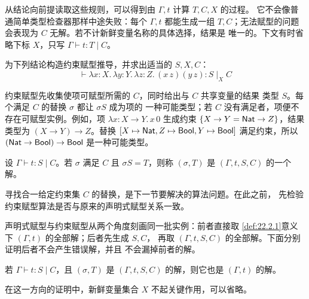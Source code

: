从结论向前提读取这些规则，可以得到由 \(\Gamma,t\) 计算 \(T,C,X\) 的过程。
它不会像普通简单类型检查器那样中途失败：每个 \(\Gamma,t\) 都能生成一组
\(T,C\)；无法赋型的问题会表现为 \(C\) 无解。若不计新鲜变量名称的具体选择，结果是
唯一的。下文有时省略下标 \(X\)，只写
\(\Gamma\vdash t:T\mid C\)。

\begin{exercise}[\(\star\), \(\nrightarrow\)]
\label{ex:22.3.3}
为下列结论构造约束赋型推导，并求出适当的 \(S,X,C\)：
\[
\vdash\lambda x:X.\,\lambda y:Y.\,\lambda z:Z.\,(x\,z)(y\,z)
  :S\mid_XC
\]
\end{exercise}

约束赋型先收集使项可赋型所需的 \(C\)，同时给出与 \(C\) 共享变量的结果
类型 \(S\)。每个满足 \(C\) 的替换 \(\sigma\) 都让 \(\sigma S\) 成为项的
一种可能类型；若 \(C\) 没有满足者，项便不存在可赋型实例。例如，项
\(\lambda x:X\to Y.\,x\,0\) 生成约束
\(\{X\to Y=\mathsf{Nat}\to Z\}\)，结果类型为
\((X\to Y)\to Z\)。替换
\([X\mapsto\mathsf{Nat},Z\mapsto\mathsf{Bool},
Y\mapsto\mathsf{Bool}]\) 满足约束，所以
\((\mathsf{Nat}\to\mathsf{Bool})\to\mathsf{Bool}\) 是一种可能类型。

\begin{definition}
\label{def:22.3.4}
设 \(\Gamma\vdash t:S\mid C\)。若 \(\sigma\) 满足 \(C\) 且
\(\sigma S=T\)，则称 \((\sigma,T)\) 是
\((\Gamma,t,S,C)\) 的一个解。
\end{definition}

寻找合一给定约束集 \(C\) 的替换，是下一节要解决的算法问题。在此之前，
先检验约束赋型算法是否与原来的声明式赋型关系一致。

声明式赋型与约束赋型从两个角度刻画同一批实例：前者直接取
\cref{def:22.2.1}意义下 \((\Gamma,t)\) 的全部解；后者先生成 \(S,C\)，
再取 \((\Gamma,t,S,C)\) 的全部解。下面分别证明后者不会产生错误解，并且
不会漏掉前者的解。

\begin{theorem}[约束赋型的可靠性]
\label{thm:22.3.5}
若 \(\Gamma\vdash t:S\mid C\)，且 \((\sigma,T)\) 是
\((\Gamma,t,S,C)\) 的解，则它也是 \((\Gamma,t)\) 的解。
\end{theorem}

在这一方向的证明中，新鲜变量集合 \(X\) 不起关键作用，可以省略。

